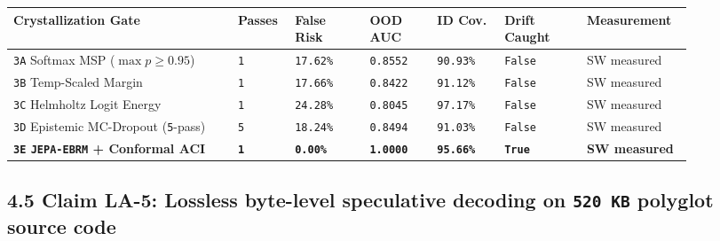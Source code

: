 \documentclass[10pt]{article}
\begin{document}
{\footnotesize\setlength{\tabcolsep}{3.5pt}
\begin{longtable}{@{}L{0.30\linewidth}C{0.07\linewidth}C{0.10\linewidth}C{0.09\linewidth}C{0.09\linewidth}C{0.11\linewidth}L{0.13\linewidth}@{}}
\toprule
\textbf{Crystallization Gate} & \textbf{Passes} & \textbf{False Risk} & \textbf{OOD AUC} & \textbf{ID Cov.} & \textbf{Drift Caught} & \textbf{Measurement} \\
\midrule
\endhead
\texttt{3A} Softmax MSP ($\max p \ge 0.95$) & \texttt{1} & \texttt{17.62\%} & \texttt{0.8552} & \texttt{90.93\%} & \texttt{False} & SW measured \\
\texttt{3B} Temp-Scaled Margin & \texttt{1} & \texttt{17.66\%} & \texttt{0.8422} & \texttt{91.12\%} & \texttt{False} & SW measured \\
\texttt{3C} Helmholtz Logit Energy & \texttt{1} & \texttt{24.28\%} & \texttt{0.8045} & \texttt{97.17\%} & \texttt{False} & SW measured \\
\texttt{3D} Epistemic MC-Dropout (\texttt{5}-pass) & \texttt{5} & \texttt{18.24\%} & \texttt{0.8494} & \texttt{91.03\%} & \texttt{False} & SW measured \\
\textbf{\texttt{3E} \texttt{JEPA-EBRM} + Conformal ACI} & \textbf{\texttt{1}} & \textbf{\texttt{0.00\%}} & \textbf{\texttt{1.0000}} & \textbf{\texttt{95.66\%}} & \textbf{\texttt{True}} & \textbf{SW measured} \\
\bottomrule
\end{longtable}
}

\subsection{4.5 Claim LA-5: Lossless byte-level speculative decoding on \texttt{520 KB} polyglot source code}\label{claim-la5}
\end{document}
